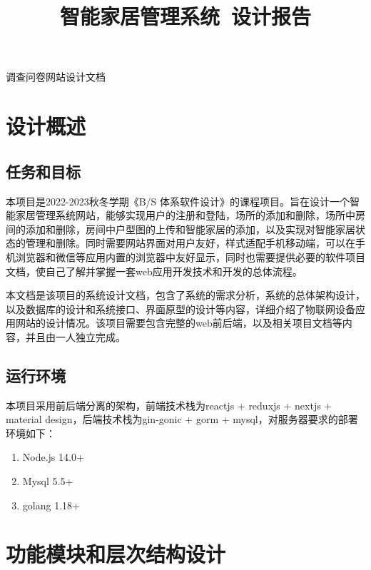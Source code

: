 \documentclass[utf8,a4paper,20pt]{article}
\title{智能家居管理系统\ 设计报告}
\author{}
\date{}
\begin{document}
\begin{center}
    \Large{调查问卷网站设计文档}\par
\end{center}
\section{设计概述}
\subsection{任务和目标}
\par 
    本项目是2022-2023秋冬学期《B/S 体系软件设计》的课程项目。旨在设计一个智能家居管理系统网站，能够实现用户的注册和登陆，场所的添加和删除，场所中房间的添加和删除，房间中户型图的上传和智能家居的添加，以及实现对智能家居状态的管理和删除。同时需要网站界面对用户友好，样式适配手机移动端，可以在手机浏览器和微信等应用内置的浏览器中友好显示，同时也需要提供必要的软件项目文档，使自己了解并掌握一套web应用开发技术和开发的总体流程。
\par 
    本文档是该项目的系统设计文档，包含了系统的需求分析，系统的总体架构设计，以及数据库的设计和系统接口、界面原型的设计等内容，详细介绍了物联网设备应用网站的设计情况。该项目需要包含完整的web前后端，以及相关项目文档等内容，并且由一人独立完成。
\subsection{运行环境}
\par 
    本项目采用前后端分离的架构，前端技术栈为reactjs + reduxjs + nextjs + material design，后端技术栈为gin-gonic + gorm + mysql，对服务器要求的部署环境如下：
\begin{enumerate}
    \item Node.js 14.0+
    \item Mysql 5.5+
    \item golang 1.18+
\end{enumerate}

\section{功能模块和层次结构设计}
\end{document}
